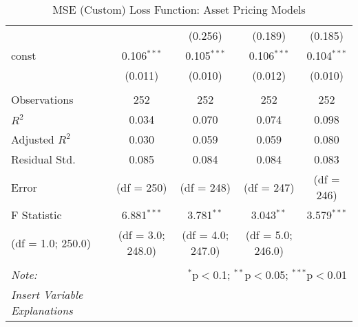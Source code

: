 \begin{table}[H]
\begin{tabular}{@{\extracolsep{5pt}}lcccc}
                      &                                                                                  & (0.256)           & (0.189)           & (0.185)       \\
    const             & 0.106$^{***}$                                                                    & 0.105$^{***}$     & 0.106$^{***}$     & 0.104$^{***}$ \\
                      & (0.011)                                                                          & (0.010)           & (0.012)           & (0.010)       \\
    \hline                                                                                                                                                       \\[-1.8ex]
    Observations      & 252                                                                              & 252               & 252               & 252           \\
    $R^2$             & 0.034                                                                            & 0.070             & 0.074             & 0.098         \\
    Adjusted $R^2$    & 0.030                                                                            & 0.059             & 0.059             & 0.080         \\
    Residual Std.     & 0.085                                                                            & 0.084             & 0.084             & 0.083         \\
    Error             & (df = 250)                                                                       & (df = 248)        & (df = 247)        & (df = 246)    \\
    F Statistic       & 6.881$^{***}$                                                                    & 3.781$^{**}$      & 3.043$^{**}$      & 3.579$^{***}$ \\
    (df = 1.0; 250.0) & (df = 3.0; 248.0)                                                                & (df = 4.0; 247.0) & (df = 5.0; 246.0)                 \\
    \hline
    \hline                                                                                                                                                       \\[-1.8ex]
    \textit{Note:}    & \multicolumn{4}{r}{$^{*}$p$<$0.1; $^{**}$p$<$0.05; $^{***}$p$<$0.01}                                                                     \\
    \textit{Insert Variable Explanations}                                                                                                                        \\
  \end{tabular}
  \caption{MSE (Custom) Loss Function: Asset Pricing Models}
  \label{mse-apm}
\end{table}
